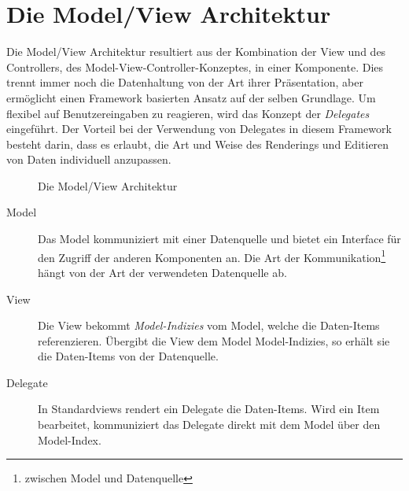 \documentclass[11pt,a4paper,titlepage]{scrreprt}
\begin{document}
\section{Die Model/View Architektur}
Die Model/View Architektur resultiert aus der Kombination der View und des Controllers,
des Model-View-Controller-Konzeptes, in einer Komponente. Dies trennt immer noch die
Datenhaltung von der Art ihrer Präsentation, aber ermöglicht einen Framework basierten
Ansatz auf der selben Grundlage. Um flexibel auf Benutzereingaben zu reagieren, wird das
Konzept der {\itshape Delegates} eingeführt. Der Vorteil bei der Verwendung von Delegates
in diesem Framework besteht darin, dass es erlaubt, die Art und Weise des Renderings und Editieren
von Daten individuell anzupassen.{\medskip}

\begin{figure}[h]
\begin{center}
\caption{Die Model/View Architektur}
\end{center}
\end{figure}

\begin{description}
\item[Model]
Das Model kommuniziert mit einer Datenquelle und bietet ein Interface für den Zugriff
der anderen Komponenten an. Die Art der Kommunikation\footnote{zwischen Model und
Datenquelle} hängt von der Art der verwendeten Datenquelle ab.
\item[View]
Die View bekommt {\itshape Model-Indizies} vom Model, welche die Daten-Items referenzieren.
Übergibt die View dem Model Model-Indizies, so erhält sie die Daten-Items von der Datenquelle.
\item[Delegate]
In Standardviews rendert ein Delegate die Daten-Items. Wird ein Item bearbeitet,
kommuniziert das Delegate direkt mit dem Model über den Model-Index.
\end{description}
\end{document}
